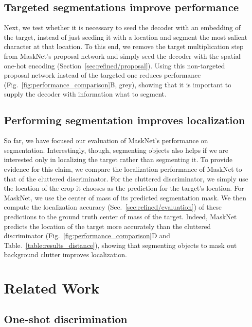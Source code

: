 \documentclass{article}
\begin{document}
\subsection{Targeted segmentations improve performance}
\label{sec:results/ablation}

Next, we test whether it is necessary to seed the decoder with an embedding of the target, instead of just seeding it with a location and segment the most salient character at that location.
To this end, we remove the target multiplication step from MaskNet's proposal network and simply seed the decoder with the spatial one-hot encoding (Section~\ref{sec:refined/proposal}).
Using this non-targeted proposal network instead of the targeted one reduces performance (Fig.~\ref{fig:performance_comparison}B, grey), showing that it is important to supply the decoder with information what to segment.



\subsection{Performing segmentation improves localization}
\label{sec:results/distances}

So far, we have focused our evaluation of MaskNet's performance on segmentation.
Interestingly, though, segmenting objects also helps if we are interested only in localizing the target rather than segmenting it.
To provide evidence for this claim, we compare the localization performance of MaskNet to that of the cluttered discriminator.
For the cluttered discriminator, we simply use the location of the crop it chooses as the prediction for the target's location.
For MaskNet, we use the center of mass of its predicted segmentation mask.
We then compute the localization accuracy (Sec.~\ref{sec:refined/evaluation}) of these predictions to the ground truth center of mass of the target.
Indeed, MaskNet predicts the location of the target more accurately than the cluttered discriminator (Fig.~\ref{fig:performance_comparison}D and Table.~\ref{table:results_distance}), showing that segmenting objects to mask out background clutter improves localization.



\section{Related Work}
\label{sec:related_work}

\subsection{One-shot discrimination}
\end{document}
